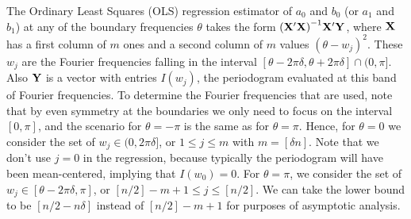 \documentclass[12p E.Lt,psfig]{article} %
\begin{document}
 The Ordinary Least Squares (OLS)
 regression estimator  of $a_0$ and $b_0$  (or $a_1$ and $b_1$)
 at any of the boundary frequencies $\theta$ takes the form
 $ {( {\bf X}^{\prime} {\bf X} )}^{-1} {\bf X}^{\prime} {\bf Y}$,  where
 ${\bf X}$ has a first column of $m$ ones and a second column of $m$ values
  ${(  \theta  - w_j)}^2$.
    These $w_j$ are the Fourier frequencies
   falling in the interval $[  \theta  - 2 \pi \delta,  \theta  + 2 \pi \delta] \cap ( 0, \pi]$.
   Also ${\bf Y}$ is  a vector with entries $I(w_j)$, the periodogram evaluated at this
   band of Fourier frequencies.    To determine the Fourier frequencies that are used,
   note that by even symmetry at the boundaries we only need to focus on the interval
   $[0, \pi]$, and the scenario for $\theta = - \pi$ is the same as for $\theta = \pi$.
    Hence, for $\theta = 0$ we consider the set of $w_j \in (0, 2 \pi \delta]$,
    or $1 \leq j \leq m$ with $m =  [ \delta n]$.
    Note that  we don't use $j =0$ in the regression,  because typically the periodogram
    will have been mean-centered, implying that $I(w_0) = 0$.
  For $\theta =   \pi$,  we consider the set of $w_j \in [  \theta  - 2 \pi \delta, \pi]$,
  or $ [ n /2] - m +1  \leq j \leq [n/2]$.   We can take the lower bound to
  be  $[n/2 - n \delta]$  instead of  $[n/2] - m+1$  for purposes of asymptotic analysis.
\end{document}
